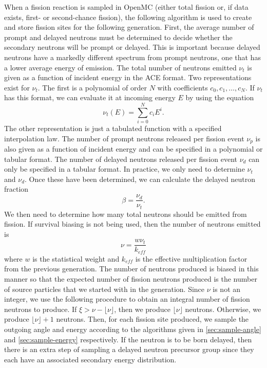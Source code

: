 When a fission reaction is sampled in OpenMC (either total fission or, if data
exists, first- or second-chance fission), the following algorithm is used to
create and store fission sites for the following generation. First, the average
number of prompt and delayed neutrons must be determined to decide whether the
secondary neutrons will be prompt or delayed. This is important because delayed
neutrons have a markedly different spectrum from prompt neutrons, one that has a
lower average energy of emission. The total number of neutrons emitted $\nu_t$
is given as a function of incident energy in the ACE format. Two representations
exist for $\nu_t$. The first is a polynomial of order $N$ with coefficients
$c_0,c_1,\dots,c_N$. If $\nu_t$ has this format, we can evaluate it at incoming
energy $E$ by using the equation
\begin{equation}
  \label{eq:nu-polynomial}
  \nu_t (E) = \sum_{i = 0}^N c_i E^i.
\end{equation}
The other representation is just a tabulated function with a specified
interpolation law. The number of prompt neutrons released per fission event
$\nu_p$ is also given as a function of incident energy and can be specified in a
polynomial or tabular format. The number of delayed neutrons released per
fission event $\nu_d$ can only be specified in a tabular format. In practice, we
only need to determine $\nu_t$ and $\nu_d$. Once these have been determined, we
can calculate the delayed neutron fraction
\begin{equation}
  \label{eq:beta}
  \beta = \frac{\nu_d}{\nu_t}.
\end{equation}
We then need to determine how many total neutrons should be emitted from
fission. If survival biasing is not being used, then the number of neutrons
emitted is
\begin{equation}
  \label{eq:fission-neutrons}
  \nu = \frac{w \nu_t}{k_{eff}}
\end{equation}
where $w$ is the statistical weight and $k_{eff}$ is the effective
multiplication factor from the previous generation. The number of neutrons
produced is biased in this manner so that the expected number of fission
neutrons produced is the number of source particles that we started with in the
generation. Since $\nu$ is not an integer, we use the following procedure to
obtain an integral number of fission neutrons to produce. If $\xi > \nu -
\lfloor \nu \rfloor$, then we produce $\lfloor \nu \rfloor$ neutrons. Otherwise,
we produce $\lfloor \nu \rfloor + 1$ neutrons. Then, for each fission site
produced, we sample the outgoing angle and energy according to the algorithms
given in \autoref{sec:sample-angle} and \autoref{sec:sample-energy}
respectively. If the neutron is to be born delayed, then there is an extra step
of sampling a delayed neutron precursor group since they each have an associated
secondary energy distribution.


